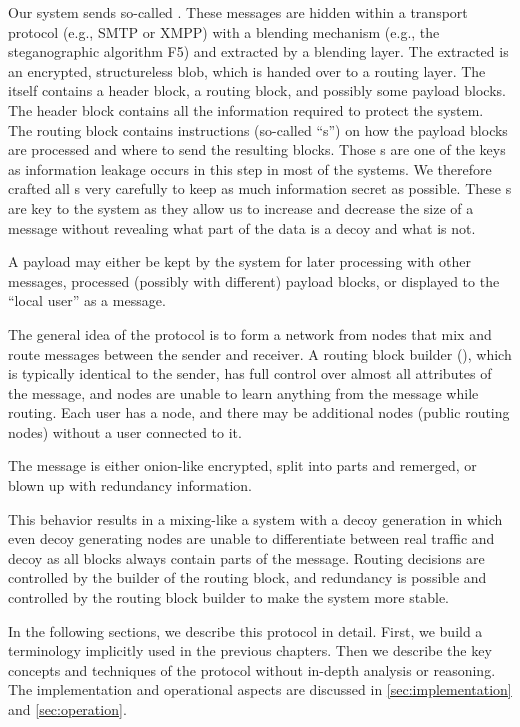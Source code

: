 Our system sends so-called \VortexMessages. These messages are hidden within a transport protocol (e.g., SMTP or XMPP) with a blending mechanism (e.g., the steganographic algorithm F5) and extracted by a blending layer. The extracted \VortexMessage{} is an encrypted, structureless blob, which is handed over to a routing layer. The \VortexMessage{} itself contains a header block, a routing block, and possibly some payload blocks. The header block contains all the information required to protect the system. The routing block contains instructions (so-called ``s'') on how the payload blocks are processed and where to send the resulting blocks. Those s are one of the keys as information leakage occurs in this step in most of the systems. We therefore crafted all s very carefully to keep as much information secret as possible. These s are key to the system as they allow us to increase and decrease the size of a message without revealing what part of the data is a decoy and what is not.

A payload may either be kept by the system for later processing with other messages, processed (possibly with different) payload blocks, or displayed to the ``local user'' as a message.

The general idea of the protocol is to form a network from nodes that mix and route messages between the sender and receiver. A routing block builder (), which is typically identical to the sender, has full control over almost all attributes of the message, and nodes are unable to learn anything from the message while routing. Each user has a node, and there may be additional nodes (public routing nodes) without a user connected to it. 

The message is either onion-like encrypted, split into parts and remerged, or blown up with redundancy information. 

This behavior results in a mixing-like a system with a decoy generation in which even decoy generating nodes are unable to differentiate between real traffic and decoy as all blocks always contain parts of the message. Routing decisions are controlled by the builder of the routing block, and redundancy is possible and controlled by the routing block builder to make the system more stable.

In the following sections, we describe this protocol in detail. First, we build a terminology implicitly used in the previous chapters. Then we describe the key concepts and techniques of the protocol without in-depth analysis or reasoning. The implementation and operational aspects are discussed in \cref{sec:implementation} and \cref{sec:operation}. 



